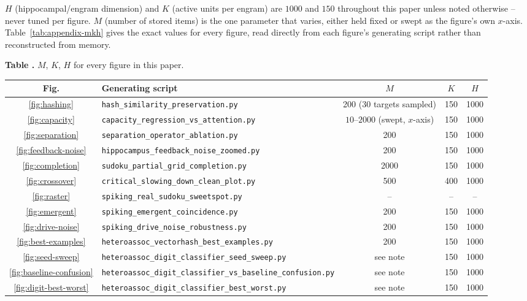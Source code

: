 \documentclass[11pt]{article}
\newcommand{\toprule}{\hline\hline}
\newcommand{\midrule}{\hline}
\begin{document}
$H$ (hippocampal/engram dimension) and $K$ (active units per engram) are $1000$ and $150$
throughout this paper unless noted otherwise -- never tuned per figure. $M$ (number of
stored items) is the one parameter that varies, either held fixed or swept as the figure's
own $x$-axis. Table~\ref{tab:appendix-mkh} gives the exact values for every figure, read
directly from each figure's generating script rather than reconstructed from memory.

\label{tab:appendix-mkh}
\noindent\textbf{Table \thetable.} $M$, $K$, $H$ for every figure in this paper.
\begin{center}
\scriptsize
\begin{tabular}{clccc}
\toprule
Fig. & Generating script & $M$ & $K$ & $H$ \\
\midrule
\ref{fig:hashing} & \texttt{hash\_similarity\_preservation.py} & 200 (30 targets sampled) & 150 & 1000 \\
\ref{fig:capacity} & \texttt{capacity\_regression\_vs\_attention.py} & $10$--$2000$ (swept, $x$-axis) & 150 & 1000 \\
\ref{fig:separation} & \texttt{separation\_operator\_ablation.py} & 200 & 150 & 1000 \\
\ref{fig:feedback-noise} & \texttt{hippocampus\_feedback\_noise\_zoomed.py} & 200 & 150 & 1000 \\
\ref{fig:completion} & \texttt{sudoku\_partial\_grid\_completion.py} & 2000 & 150 & 1000 \\
\ref{fig:crossover} & \texttt{critical\_slowing\_down\_clean\_plot.py} & 500 & 400 & 1000 \\
\ref{fig:raster} & \texttt{spiking\_real\_sudoku\_sweetspot.py} & -- & -- & -- \\
\ref{fig:emergent} & \texttt{spiking\_emergent\_coincidence.py} & 200 & 150 & 1000 \\
\ref{fig:drive-noise} & \texttt{spiking\_drive\_noise\_robustness.py} & 200 & 150 & 1000 \\
\ref{fig:best-examples} & \texttt{heteroassoc\_vectorhash\_best\_examples.py} & 200 & 150 & 1000 \\
\ref{fig:seed-sweep} & \texttt{heteroassoc\_digit\_classifier\_seed\_sweep.py} & see note & 150 & 1000 \\
\ref{fig:baseline-confusion} & \texttt{heteroassoc\_digit\_classifier\_vs\_baseline\_confusion.py} & see note & 150 & 1000 \\
\ref{fig:digit-best-worst} & \texttt{heteroassoc\_digit\_classifier\_best\_worst.py} & see note & 150 & 1000 \\

\end{tabular}
\end{center}
\end{document}
